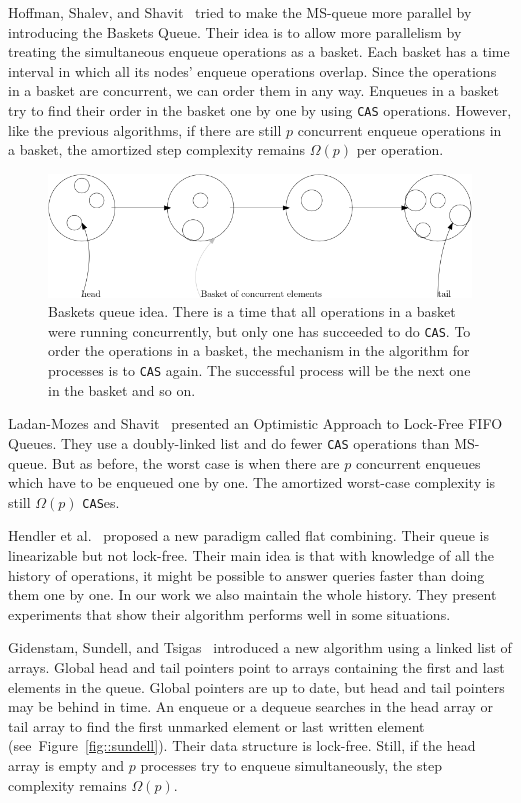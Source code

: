 \documentclass[10pt]{article}
\theoremstyle{definition}
\begin{document}
Hoffman, Shalev, and Shavit~\cite{DBLP:conf/opodis/HoffmanSS07} tried to make the MS-queue more parallel by introducing the Baskets Queue. Their idea is to allow more parallelism by treating the simultaneous enqueue operations as a basket. Each basket has a time interval in which all its nodes' enqueue operations overlap. Since the operations in a basket are concurrent, we can order them in any way. Enqueues in a basket try to find their order in the basket one by one by using \texttt{CAS} operations. However, like the previous algorithms, if there are still $p$ concurrent enqueue operations in a basket, the amortized step complexity remains $\Omega(p)$ per operation.

\begin{figure}[hbt]
  \center\includegraphics[scale=0.3]{pics/baskets}
  \caption{Baskets queue idea. There is a time that all operations in a basket were running concurrently, but only one has succeeded to do \texttt{CAS}. To order the operations in a basket, the mechanism in the algorithm for processes is to \texttt{CAS} again. The successful process will be the next one in the basket and so on.}
\end{figure}

Ladan-Mozes and Shavit~\cite{DBLP:journals/dc/Ladan-MozesS08} presented an Optimistic Approach to Lock-Free FIFO Queues. They use a doubly-linked list and do fewer \texttt{CAS} operations than MS-queue. But as before, the worst case is when there are $p$ concurrent enqueues which have to be enqueued one by one. The amortized worst-case complexity is still $\Omega(p)$ \texttt{CAS}es.

Hendler et al.~\cite{DBLP:conf/spaa/HendlerIST10} proposed a new paradigm called flat combining. Their queue is linearizable but not lock-free. Their main idea is that with knowledge of all the history of operations, it might be possible to answer queries faster than doing them one by one. In our work we also maintain the whole history. They present experiments that show their algorithm performs well in some situations.

Gidenstam, Sundell, and Tsigas~\cite{DBLP:conf/opodis/GidenstamST10} introduced a new algorithm using a linked list of arrays. Global head and tail pointers point to arrays containing the first and last elements in the queue. Global pointers are up to date, but head and tail pointers may be behind in time. An enqueue or a dequeue searches in the head array or tail array to find the first unmarked element or last written element (see~Figure~\ref{fig::sundell}). Their data structure is lock-free. Still, if the head array is empty and $p$ processes try to enqueue simultaneously, the step complexity remains $\Omega(p)$.
\end{document}
